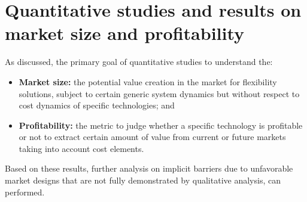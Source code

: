 




\section[Quantitative studies and results on market size and profitability]{Quantitative studies and results on market size and profitability%
	}
\label{sec:quantitative}
As discussed, the primary goal of quantitative studies to understand the:

\begin{itemize}
	\item \textbf{Market size:} the potential value creation in the market for flexibility solutions, subject to certain generic system dynamics but without respect to cost dynamics of specific technologies; and
	\item \textbf{Profitability:} the metric to judge whether a specific technology is profitable or not to extract certain amount of value from current or future markets taking into account cost elements.
\end{itemize}

Based on these results, further analysis on implicit barriers due to unfavorable market designs that are not fully demonstrated by qualitative analysis, can performed.

